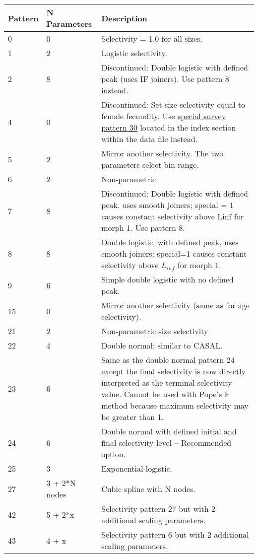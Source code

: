 \begin{longtable}{p{2cm} p{3cm} p{10cm}}
	Pattern & N Parameters & Description \Tstrut\Bstrut\\
	\hline
	0 \Tstrut& 0 & Selectivity = 1.0 for all sizes. \\
	1 \Tstrut& 2 & Logistic selectivity.\\
	2 \Tstrut& 8 & Discontinued: Double logistic with defined peak (uses IF joiners). Use pattern 8 instead.\\
	4 \Tstrut& 0 & Discontinued: Set size selectivity equal to female fecundity. Use \hyperlink{SpecialSurvey}{special survey pattern 30} located in the index section within the data file instead.\\
	5 \Tstrut& 2 & Mirror another selectivity. The two parameters select bin range.\\
	6 \Tstrut& 2 & Non-parametric \\
	7 \Tstrut& 8 & Discontinued: Double logistic with defined peak, uses smooth joiners; special = 1 causes constant selectivity above Linf for morph 1.  Use pattern 8.\\
	8 \Tstrut& 8 & Double logistic, with defined peak, uses smooth joiners; special=1 causes constant selectivity above $L_{inf}$ for morph 1.  \\
	9 \Tstrut& 6 & Simple double logistic with no defined peak.\\
	15 \Tstrut& 0 & Mirror another selectivity (same as for age selectivity).\\
	21 \Tstrut& 2  & Non-parametric size selectivity\\
	22 \Tstrut& 4 & Double normal; similar to CASAL.\\
	23 \Tstrut& 6 & Same as the double normal pattern 24 except the final selectivity is now directly interpreted as the terminal selectivity value. Cannot be used with Pope's F method because maximum selectivity may be greater than 1.\\
	24 \Tstrut& 6 & Double normal with defined initial and final selectivity level – Recommended option.\\
	25 \Tstrut& 3 & Exponential-logistic. \\
	27 \Tstrut& 3 + 2*N nodes & Cubic spline with N nodes. \\
	42 \Tstrut& 5 + 2*x & Selectivity pattern 27 but with 2 additional scaling parameters. \\
	43 \Tstrut& 4 + x & Selectivity pattern 6 but with 2 additional scaling parameters.\Bstrut\\
	\hline
\end{longtable}


